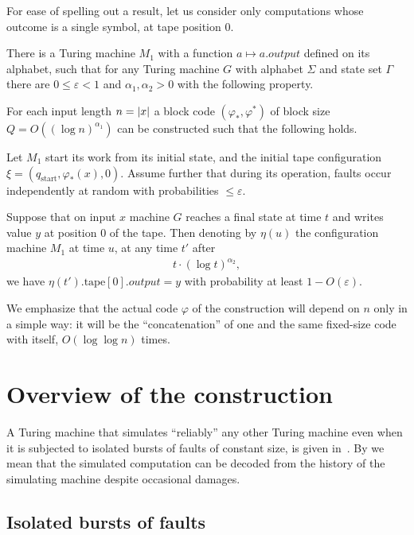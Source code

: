 \documentclass[12pt]{memoir}
\renewcommand{\le}{\leq}
\newcommand{\Output}{\mathit{output}}
\newcommand{\start}{\mathrm{start}}
\newcommand{\tape}{\mathrm{tape}}
\begin{document}
For ease of spelling out a result, let us consider only computations whose outcome
is a single symbol, at tape position 0.

\begin{theorem}\label{thm:main-main}
There is a Turing machine \( M_{1} \) with a 
function \( a\mapsto a.\Output \) defined on its alphabet, 
such that
for any Turing machine \( G \) with alphabet \( \Sigma \) and state set \( \Gamma \)
there are \( 0\le\varepsilon <1 \) and \( \alpha_{1},\alpha_{2}>0 \) 
with the following property.

For each input length \( n=\lvert x \rvert \) a block code
\( (\varphi_*, \varphi^*) \) of block size \( Q=O((\log n)^{\alpha_{1}}) \) can be constructed 
such that the following holds.

Let \( M_1 \) start its work from its initial state,
and the initial tape configuration \( \xi=(q_{\start},\varphi_{*}(x),0) \).
Assume further that
during its operation, faults occur independently at random
with probabilities \( \le \varepsilon \).

Suppose that on input \( x \) machine \( G \) reaches a final state at time \( t \) and writes
value \( y \) at position 0 of the tape.
Then denoting by \( \eta(u) \) the configuration machine \( M_{1} \) at time \( u \),
at any time \( t' \) after
 \begin{align*}
   t\cdot (\log t)^{\alpha_{2}},
 \end{align*}
we have \( \eta(t').\tape[0].\Output= y \)
with probability at least \( 1 - O(\varepsilon) \).
\end{theorem}

We emphasize that the actual
code \( \varphi \) of the construction will depend on \( n \) only in a simple way:
it will be the ``concatenation'' of one and the same fixed-size
code with itself, \( O(\log\log n) \) times.


\section{Overview of the construction}

A Turing machine that simulates ``reliably'' any other
Turing machine even when it is subjected to isolated bursts of faults of constant size,
is given in~\cite{burstyTuring13}.
By  we mean that the 
simulated computation can be decoded from the history
of the simulating machine despite occasional damages.


\subsection{Isolated bursts of faults}\label{sec:bursts}
\end{document}
